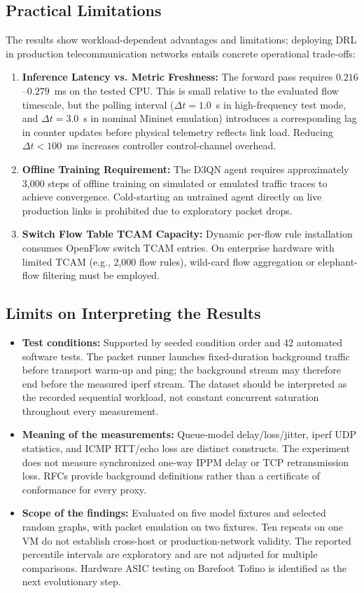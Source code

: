 \documentclass[12pt,a4paper,oneside]{report}
\begin{document}
\subsection{Practical Limitations}
The results show workload-dependent advantages and limitations; deploying DRL in production telecommunication networks entails concrete operational trade-offs:
\begin{enumerate}
    \item \textbf{Inference Latency vs. Metric Freshness:} The forward pass requires $0.216$--$0.279$~ms on the tested CPU. This is small relative to the evaluated flow timescale, but the polling interval ($\Delta t = 1.0$~s in high-frequency test mode, and $\Delta t = 3.0$~s in nominal Mininet emulation) introduces a corresponding lag in counter updates before physical telemetry reflects link load. Reducing $\Delta t < 100$~ms increases controller control-channel overhead.
    \item \textbf{Offline Training Requirement:} The D3QN agent requires approximately 3,000 steps of offline training on simulated or emulated traffic traces to achieve convergence. Cold-starting an untrained agent directly on live production links is prohibited due to exploratory packet drops.
    \item \textbf{Switch Flow Table TCAM Capacity:} Dynamic per-flow rule installation consumes OpenFlow switch TCAM entries. On enterprise hardware with limited TCAM (e.g., 2,000 flow rules), wild-card flow aggregation or elephant-flow filtering must be employed.
\end{enumerate}

\subsection{Limits on Interpreting the Results}
\begin{itemize}
    \item \textbf{Test conditions:} Supported by seeded condition order and 42 automated software tests. The packet runner launches fixed-duration background traffic before transport warm-up and ping; the background stream may therefore end before the measured iperf stream. The dataset should be interpreted as the recorded sequential workload, not constant concurrent saturation throughout every measurement.
    \item \textbf{Meaning of the measurements:} Queue-model delay/loss/jitter, iperf UDP statistics, and ICMP RTT/echo loss are distinct constructs. The experiment does not measure synchronized one-way IPPM delay or TCP retransmission loss. RFCs provide background definitions rather than a certificate of conformance for every proxy.
    \item \textbf{Scope of the findings:} Evaluated on five model fixtures and selected random graphs, with packet emulation on two fixtures. Ten repeats on one VM do not establish cross-host or production-network validity. The reported percentile intervals are exploratory and are not adjusted for multiple comparisons. Hardware ASIC testing on Barefoot Tofino is identified as the next evolutionary step.
\end{itemize}
\end{document}

